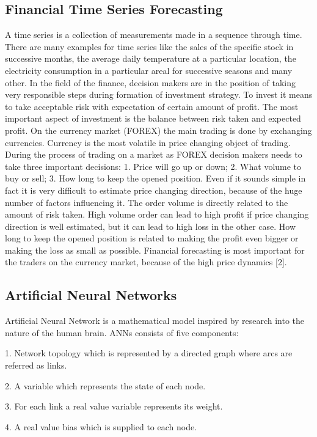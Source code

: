 \documentclass{llncs}
\begin{document}
\subsection{Financial Time Series Forecasting}
%
A time series is a collection of measurements made in a sequence through time. There are many examples for time series like the sales of the specific stock in successive months, the average daily temperature at a particular location, the electricity consumption in a particular areal for successive seasons and many other. In the field of the finance, decision makers are in the position of taking very responsible steps during formation of investment strategy. To invest it means to take acceptable risk with expectation of certain amount of profit. The most important aspect of investment is the balance between risk taken and expected profit. On the currency market (FOREX) the main trading is done by exchanging currencies. Currency is the most volatile in price changing object of trading. During the process of trading on a market as FOREX decision makers needs to take three important decisions: 1. Price will go up or down; 2. What volume to buy or sell; 3. How long to keep the opened position. Even if it sounds simple in fact it is very difficult to estimate price changing direction, because of the huge number of factors influencing it. The order volume is directly related to the amount of risk taken. High volume order can lead to high profit if price changing direction is well estimated, but it can lead to high loss in the other case. How long to keep the opened position is related to making the profit even bigger or making the loss as small as possible. Financial forecasting is most important for the traders on the currency market, because of the high price dynamics [2].
%
\subsection{Artificial Neural Networks}
%
Artificial Neural Network is a mathematical model inspired by research into the nature of the human brain. ANNs consists of five components: 

1. Network topology which is represented by a directed graph where arcs are referred as links.

2. A variable which represents the state of each node.

3. For each link a real value variable represents its weight.

4. A real value bias which is supplied to each node.
\end{document}
